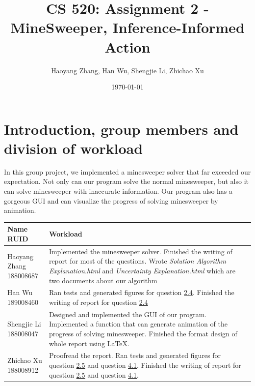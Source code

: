 \documentclass[letter]{article}
\title{CS 520: Assignment 2 - MineSweeper, Inference-Informed Action}
\author{Haoyang Zhang, Han Wu, Shengjie Li, Zhichao Xu}
\date{\today}
\begin{document}
\maketitle

\section{Introduction, group members and division of workload}
\label{sec:Introduction}

In this group project, we implemented a minesweeper solver that far exceeded our expectation. Not only can our program solve the normal minesweeper, but also it can solve minesweeper with inaccurate information. Our program also has a gorgeous GUI and can visualize the progress of solving minesweeper by animation. \\
\begin{tabular}{| p{2.5cm} | p{\textwidth -3.5cm} |}
	\hline
	\makecell[c]{Name \\ RUID} & Workload \\
	\hline
	\makecell[c]{Haoyang Zhang \\ 188008687} & {Implemented the minesweeper solver. Finished the writing of report for most of the questions. Wrote \textit{Solution Algorithm Explanation.html} and \textit{Uncertainty Explanation.html} which are two documents about our algorithm} \\
	\hline
	\makecell[c]{Han Wu \\ 189008460} & {Ran tests and generated figures for question \hyperref[han]{2.4}. Finished the writing of report for question \hyperref[han]{2.4}} \\
	\hline
	\makecell[c]{Shengjie Li \\ 188008047} & {Designed and implemented the GUI of our program. Implemented a function that can generate animation of the progress of solving minesweeper. Finished the format design of whole report using \LaTeX. } \\
	\hline
	\makecell[c]{Zhichao Xu \\ 188008912} & {Proofread the report. Ran tests and generated figures for question \hyperref[zhichao1]{2.5} and question \hyperref[zhichao2]{4.1}. Finished the writing of report for question \hyperref[zhichao1]{2.5} and question \hyperref[zhichao2]{4.1}.} \\
	\hline
\end{tabular}
\end{document}
